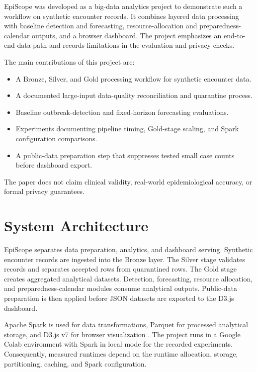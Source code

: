 \documentclass[conference]{IEEEtran}
\begin{document}
EpiScope was developed as a big-data analytics project to demonstrate such a workflow on synthetic encounter records. It combines layered data processing with baseline detection and forecasting, resource-allocation and preparedness-calendar outputs, and a browser dashboard. The project emphasizes an end-to-end data path and records limitations in the evaluation and privacy checks.

The main contributions of this project are:
\begin{itemize}
    \item A Bronze, Silver, and Gold processing workflow for synthetic encounter data.
    \item A documented large-input data-quality reconciliation and quarantine process.
    \item Baseline outbreak-detection and fixed-horizon forecasting evaluations.
    \item Experiments documenting pipeline timing, Gold-stage scaling, and Spark configuration comparisons.
    \item A public-data preparation step that suppresses tested small case counts before dashboard export.
\end{itemize}

The paper does not claim clinical validity, real-world epidemiological accuracy, or formal privacy guarantees.

\section{System Architecture}

EpiScope separates data preparation, analytics, and dashboard serving. Synthetic encounter records are ingested into the Bronze layer. The Silver stage validates records and separates accepted rows from quarantined rows. The Gold stage creates aggregated analytical datasets. Detection, forecasting, resource allocation, and preparedness-calendar modules consume analytical outputs. Public-data preparation is then applied before JSON datasets are exported to the D3.js dashboard.

Apache Spark is used for data transformations, Parquet for processed analytical storage, and D3.js v7 for browser visualization \cite{spark,parquet,d3}. The project runs in a Google Colab environment with Spark in local mode for the recorded experiments. Consequently, measured runtimes depend on the runtime allocation, storage, partitioning, caching, and Spark configuration.
\end{document}
